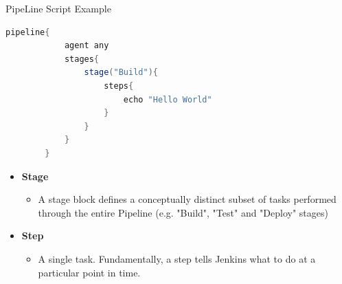 \documentclass{beamer}
\begin{document}
\begin{frame}[fragile]{PipeLine Script Example}

    \begin{lstlisting}[language=Java]
        pipeline{
            agent any
            stages{
                stage("Build"){
                    steps{
                        echo "Hello World"
                    }
                }
            }
        } \end{lstlisting}
    \begin{itemize}
        \item \textbf{Stage}
        \begin{itemize}
            \item A stage block defines a conceptually distinct subset of tasks performed through the entire Pipeline (e.g. "Build", "Test" and "Deploy" stages)
        \end{itemize}
        \item \textbf{Step}
            \begin{itemize}
                \item A single task. Fundamentally, a step tells Jenkins what to do at a particular point in time. 
            \end{itemize}
    \end{itemize}
\end{frame}
\end{document}

